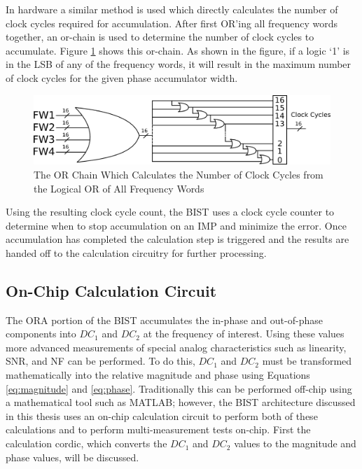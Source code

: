 \documentclass[12pt]{report}
\begin{document}
In hardware a similar method is used which directly calculates the number of clock cycles required for accumulation.  After first OR'ing all frequency words together, an or-chain is used to determine the number of clock cycles to accumulate.  Figure \ref{fig:or-chain} shows this or-chain.  As shown in the figure, if a logic `1' is in the LSB of any of the frequency words, it will result in the maximum number of clock cycles for the given phase accumulator width.  
\begin{figure}
	\begin{center}
		\includegraphics[scale=1.3]{images/or-chain}
	\end{center}
	\caption{The OR Chain Which Calculates the Number of Clock Cycles from the Logical OR of All Frequency Words}
	\label{fig:or-chain}
\end{figure}
Using the resulting clock cycle count, the BIST uses a clock cycle counter to determine when to stop accumulation on an IMP and minimize the error.  Once accumulation has completed the calculation step is triggered and the results are handed off to the calculation circuitry for further processing.

\subsection{On-Chip Calculation Circuit}
\label{sct:onchip}
The ORA portion of the BIST accumulates the in-phase and out-of-phase components into $DC_1$ and $DC_2$ at the frequency of interest.  Using these values more advanced measurements of special analog characteristics such as linearity, SNR, and NF can be performed.  To do this, $DC_1$ and $DC_2$ must be transformed mathematically into the relative magnitude and phase using Equations \ref{eq:magnitude} and \ref{eq:phase}\cite{joey}.  Traditionally this can be performed off-chip using a mathematical tool such as MATLAB; however, the BIST architecture discussed in this thesis uses an on-chip calculation circuit to perform both of these calculations and to perform multi-measurement tests on-chip\cite{joey}.  First the calculation cordic, which converts the $DC_1$ and $DC_2$ values to the magnitude and phase values, will be discussed.
\end{document}
